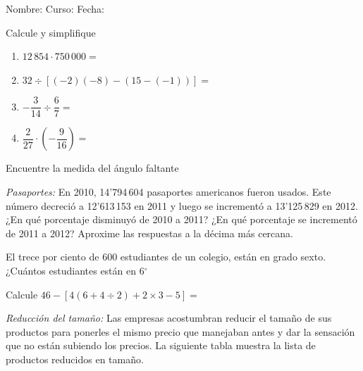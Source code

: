 \documentclass[fleqn]{article}
\newcommand{\LineaNombre}{%
\par
\vspace{\baselineskip}
Nombre:\hrulefill \; Curso: \underline{\hspace*{48pt}} \; Fecha: \underline{\hspace*{2.5cm}} \relax
\par}
\begin{document}
\LineaNombre
\begin{enumerate}
 \item Calcule y simplifique
 \begin{enumerate}
 \item $12\,854\cdot 750\,000=$\noanswer[12pt]
 \item $32\div [(-2)(-8)-(15-(-1))]=$ \noanswer[12pt]
 \item $-\dfrac{3}{14}\div \dfrac{6}{7}=$\noanswer[12pt]
 \item $\dfrac{2}{27}\cdot \left(-\dfrac{9}{16}\right)=$\noanswer[12pt]
 \end{enumerate}
\begin{minipage}{.45\textwidth}
\item Encuentre la medida del ángulo faltante
\end{minipage}\hfill
\begin{minipage}{.5\textwidth}
\begin{center}
\end{center}
\end{minipage}
\noanswer
\item \emph{Pasaportes:} En 2010, 14'794\,604 pasaportes americanos fueron usados. Este número decreció a 12'613\,153 en 2011 y luego se incrementó a 13'125\,829 en 2012. ¿En qué porcentaje disminuyó de 2010 a 2011? ¿En qué porcentaje se incrementó de 2011 a 2012? Aproxime las respuestas a la décima más cercana.\noanswer
\newpage
\item El trece por ciento de 600 estudiantes de un colegio, están en grado sexto. ¿Cuántos estudiantes están en 6$^{\circ}$\noanswer
\item Calcule $46-[4(6+4\div 2)+2\times 3-5]=$
\item \emph{Reducción del tamaño:} Las empresas acostumbran reducir el tamaño de sus productos para ponerles el mismo precio que manejaban antes y dar la sensación que no están subiendo los precios. La siguiente tabla muestra la lista de productos reducidos en tamaño.


\end{enumerate}
\end{document}
